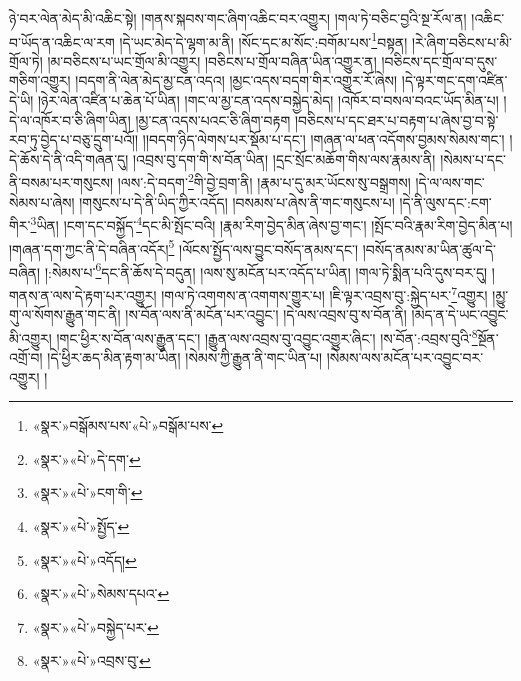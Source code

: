 ཉེ་བར་ལེན་མེད་མི་འཆིང་སྟེ། །གནས་སྐབས་གང་ཞིག་འཆིང་བར་འགྱུར། །གལ་ཏེ་བཅིང་བྱའི་སྔ་རོལ་ན། །འཆིང་བ་ཡོད་ན་འཆིང་ལ་རག །དེ་ཡང་མེད་དེ་ལྷག་མ་ནི། །སོང་དང་མ་སོང་:བགོམ་པས་\footnote{«སྣར་»བསྒོམས་པས་«པེ་»བསྒོམ་པས་}བསྟན། །རེ་ཞིག་བཅིངས་པ་མི་གྲོལ་ཏེ། །མ་བཅིངས་པ་ཡང་གྲོལ་མི་འགྱུར། །བཅིངས་པ་གྲོལ་བཞིན་ཡིན་འགྱུར་ན། །བཅིངས་དང་གྲོལ་བ་དུས་གཅིག་འགྱུར། །བདག་ནི་ལེན་མེད་མྱ་ངན་འདའ། །མྱང་འདས་བདག་གིར་འགྱུར་རོ་ཞེས། །དེ་ལྟར་གང་དག་འཛིན་དེ་ཡི། །ཉེར་ལེན་འཛིན་པ་ཆེན་པོ་ཡིན། །གང་ལ་མྱ་ངན་འདས་བསྐྱེད་མེད། །འཁོར་བ་བསལ་བའང་ཡོད་མིན་པ། །དེ་ལ་འཁོར་བ་ཅི་ཞིག་ཡིན། །མྱ་ངན་འདས་པའང་ཅི་ཞིག་བརྟག །བཅིངས་པ་དང་ཐར་པ་བརྟག་པ་ཞེས་བྱ་བ་སྟེ་རབ་ཏུ་བྱེད་པ་བཅུ་དྲུག་པའོ།། །།བདག་ཉིད་ལེགས་པར་སྡོམ་པ་དང་། །གཞན་ལ་ཕན་འདོགས་བྱམས་སེམས་གང་། །དེ་ཆོས་དེ་ནི་འདི་གཞན་དུ། །འབྲས་བུ་དག་གི་ས་བོན་ཡིན། །དྲང་སྲོང་མཆོག་གིས་ལས་རྣམས་ནི། །སེམས་པ་དང་ནི་བསམ་པར་གསུངས། །ལས་:དེ་བདག་\footnote{«སྣར་»«པེ་»དེ་དག་}གི་བྱེ་བྲག་ནི། །རྣམ་པ་དུ་མར་ཡོངས་སུ་བསྒྲགས། །དེ་ལ་ལས་གང་སེམས་པ་ཞེས། །གསུངས་པ་དེ་ནི་ཡིད་ཀྱིར་འདོད། །བསམས་པ་ཞེས་ནི་གང་གསུངས་པ། །དེ་ནི་ལུས་དང་:ངག་གིར་\footnote{«སྣར་»«པེ་»ངག་གི་}ཡིན། །ངག་དང་བསྐྱོད་\footnote{«སྣར་»«པེ་»སྤྱོད་}དང་མི་སྤོང་བའི། །རྣམ་རིག་བྱེད་མིན་ཞེས་བྱ་གང་། །སྤོང་བའི་རྣམ་རིག་བྱེད་མིན་པ། །གཞན་དག་ཀྱང་ནི་དེ་བཞིན་འདོར།\footnote{«སྣར་»«པེ་»འདོད།} །ལོངས་སྤྱོད་ལས་བྱུང་བསོད་ནམས་དང་། །བསོད་ནམས་མ་ཡིན་ཚུལ་དེ་བཞིན། །:སེམས་པ་\footnote{«སྣར་»«པེ་»སེམས་དཔའ་}དང་ནི་ཆོས་དེ་བདུན། །ལས་སུ་མངོན་པར་འདོད་པ་ཡིན། །གལ་ཏེ་སྨིན་པའི་དུས་བར་དུ། །གནས་ན་ལས་དེ་རྟག་པར་འགྱུར། །གལ་ཏེ་འགགས་ན་འགགས་གྱུར་པ། །ཇི་ལྟར་འབྲས་བུ་:སྐྱེད་པར་\footnote{«སྣར་»«པེ་»བསྐྱེད་པར་}འགྱུར། །མྱུ་གུ་ལ་སོགས་རྒྱུན་གང་ནི། །ས་བོན་ལས་ནི་མངོན་པར་འབྱུང་། །དེ་ལས་འབྲས་བུ་ས་བོན་ནི། །མེད་ན་དེ་ཡང་འབྱུང་མི་འགྱུར། །གང་ཕྱིར་ས་བོན་ལས་རྒྱུན་དང་། །རྒྱུན་ལས་འབྲས་བུ་འབྱུང་འགྱུར་ཞིང་། །ས་བོན་:འབྲས་བུའི་\footnote{«སྣར་»«པེ་»འབྲས་བུ་}སྔོན་འགྲོ་བ། །དེ་ཕྱིར་ཆད་མིན་རྟག་མ་ཡིན། །སེམས་ཀྱི་རྒྱུན་ནི་གང་ཡིན་པ། །སེམས་ལས་མངོན་པར་འབྱུང་བར་འགྱུར། །
